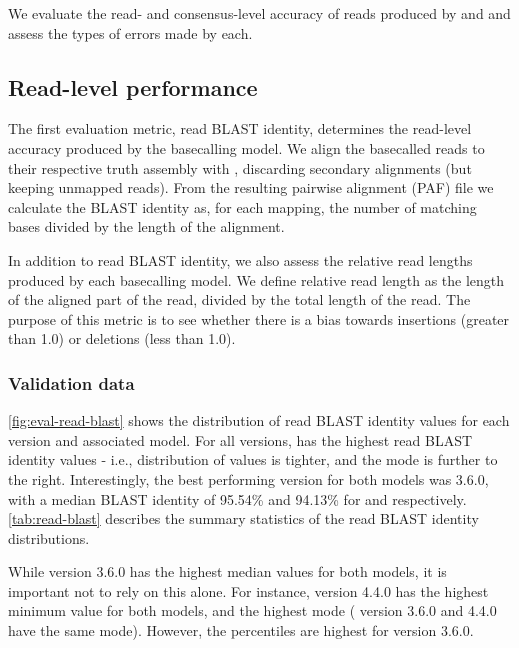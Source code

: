 We evaluate the read- and consensus-level accuracy of reads produced by \guppy{} and \tubby{} and assess the types of errors made by each. 

\subsection{Read-level performance}
\label{sec:tubby-read}

The first evaluation metric, read BLAST identity, determines the read-level accuracy produced by the basecalling model. We align the basecalled reads to their respective truth assembly with , discarding secondary alignments (but keeping unmapped reads). From the resulting pairwise alignment (PAF) file we calculate the BLAST identity as, for each mapping, the number of matching bases divided by the length of the alignment. 

In addition to read BLAST identity, we also assess the relative read lengths produced by each basecalling model. We define relative read length as the length of the aligned part of the read, divided by the total length of the read. The purpose of this metric is to see whether there is a bias towards insertions (greater than 1.0) or deletions (less than 1.0). 

\subsubsection{Validation data}

\autoref{fig:eval-read-blast} shows the distribution of read BLAST identity values for each \guppy{} version and associated \tubby{} model. For all versions, \tubby{} has the highest read BLAST identity values - i.e., distribution of values is tighter, and the mode is further to the right. Interestingly, the best performing version for both models was 3.6.0, with a median BLAST identity of 95.54\% and 94.13\% for \tubby{} and \guppy{} respectively. \autoref{tab:read-blast} describes the summary statistics of the read BLAST identity distributions.

While version 3.6.0 has the highest median values for both models, it is important not to rely on this alone. For instance, version 4.4.0 has the highest minimum value for both models, and the highest mode (\tubby{} version 3.6.0 and 4.4.0 have the same mode). However, the percentiles are highest for version 3.6.0.

